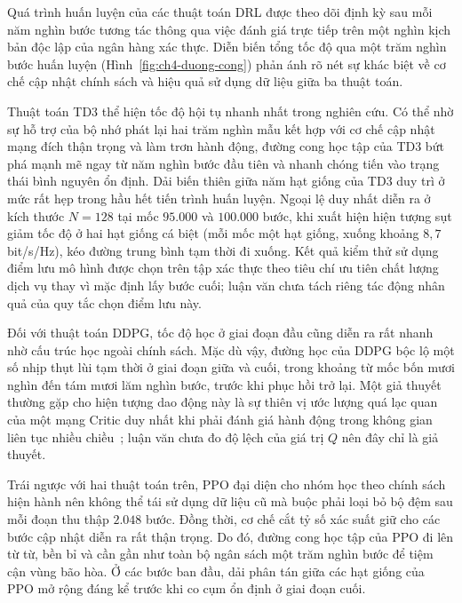 Quá trình huấn luyện của các thuật toán DRL được theo dõi định kỳ sau mỗi năm nghìn bước tương tác thông qua việc
đánh giá trực tiếp trên một nghìn kịch bản độc lập của ngân hàng xác thực. Diễn biến tổng tốc độ qua một trăm nghìn
bước huấn luyện (Hình~\ref{fig:ch4-duong-cong}) phản ánh rõ nét sự khác biệt về cơ chế cập nhật chính sách và hiệu
quả sử dụng dữ liệu giữa ba thuật toán.



Thuật toán TD3 thể hiện tốc độ hội tụ nhanh nhất trong nghiên cứu. Có thể nhờ sự hỗ trợ của bộ nhớ phát lại hai
trăm nghìn mẫu kết hợp với cơ chế cập nhật mạng đích thận trọng và làm trơn hành động, đường cong học tập của TD3
bứt phá mạnh mẽ ngay từ năm nghìn bước đầu tiên và nhanh chóng tiến vào trạng thái bình nguyên ổn định. Dải biến
thiên giữa năm hạt giống của TD3 duy trì ở mức rất hẹp trong hầu hết tiến trình huấn luyện. Ngoại lệ duy nhất diễn
ra ở kích thước $N = 128$ tại mốc $95.000$ và $100.000$ bước, khi xuất hiện hiện tượng sụt giảm tốc độ ở hai hạt
giống cá biệt (mỗi mốc một hạt giống, xuống khoảng $8,7$ bit/s/Hz), kéo đường trung bình tạm thời đi xuống. Kết quả
kiểm thử sử dụng điểm lưu mô hình được chọn trên tập xác thực theo tiêu chí ưu tiên chất lượng dịch vụ thay vì mặc
định lấy bước cuối; luận văn chưa tách riêng tác động nhân quả của quy tắc chọn điểm lưu này.

Đối với thuật toán DDPG, tốc độ học ở giai đoạn đầu cũng diễn ra rất nhanh nhờ cấu trúc học ngoài chính sách. Mặc
dù vậy, đường học của DDPG bộc lộ một số nhịp thụt lùi tạm thời ở giai đoạn giữa và cuối, trong khoảng từ mốc bốn
mươi nghìn đến tám mươi lăm nghìn bước, trước khi phục hồi trở lại. Một giả thuyết thường gặp cho hiện tượng dao
động này là sự thiên vị ước lượng quá lạc quan của một mạng Critic duy nhất khi phải đánh giá hành động trong không
gian liên tục nhiều chiều~\cite{Fujimoto2018TD3}; luận văn chưa đo độ lệch của giá trị $Q$ nên đây chỉ là giả
thuyết.

Trái ngược với hai thuật toán trên, PPO đại diện cho nhóm học theo chính sách hiện hành nên không thể tái sử dụng
dữ liệu cũ mà buộc phải loại bỏ bộ đệm sau mỗi đoạn thu thập $2.048$ bước. Đồng thời, cơ chế cắt tỷ số xác suất
giữ cho các bước cập nhật diễn ra rất thận trọng. Do đó, đường cong học tập của PPO đi lên từ từ, bền bỉ và cần gần
như toàn bộ ngân sách một trăm nghìn bước để tiệm cận vùng bão hòa. Ở các bước ban đầu, dải phân tán giữa các hạt
giống của PPO mở rộng đáng kể trước khi co cụm ổn định ở giai đoạn cuối.

